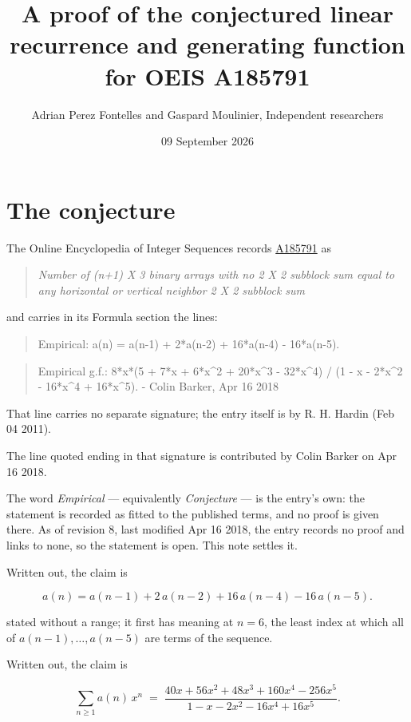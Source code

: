 \documentclass[11pt]{article}
\title{A proof of the conjectured linear recurrence and generating function for OEIS A185791}
\author{Adrian Perez Fontelles and Gaspard Moulinier, Independent researchers}
\date{09 September 2026}
\theoremstyle{definition}
\begin{document}
\maketitle
\section{The conjecture}

The Online Encyclopedia of Integer Sequences records \href{https://oeis.org/A185791}{A185791} as

\begin{quote}\itshape Number of (n+1) X 3 binary arrays with no 2 X 2 subblock sum equal to any horizontal or vertical neighbor 2 X 2 subblock sum\end{quote}

and carries in its Formula section the lines:

\begin{quote}\ttfamily Empirical: a(n) = a(n-1) + 2*a(n-2) + 16*a(n-4) - 16*a(n-5).\end{quote}

\begin{quote}\ttfamily Empirical g.f.: 8*x*(5 + 7*x + 6*x\textasciicircum{}2 + 20*x\textasciicircum{}3 - 32*x\textasciicircum{}4) / (1 - x - 2*x\textasciicircum{}2 - 16*x\textasciicircum{}4 + 16*x\textasciicircum{}5). - Colin Barker, Apr 16 2018\end{quote}

That line carries no separate signature; the entry itself is by R. H. Hardin (Feb 04 2011).

The line quoted ending in that signature is contributed by Colin Barker on Apr 16 2018.

The word {\itshape Empirical} --- equivalently {\itshape Conjecture} --- is the entry's own: the statement is recorded as fitted to the published terms, and no proof is given there. As of revision 8, last modified Apr 16 2018, the entry records no proof and links to none, so the statement is open. This note settles it.

Written out, the claim is

\[a(n) = a(n-1) + 2\,a(n-2) + 16\,a(n-4) - 16\,a(n-5).\]

stated without a range; it first has meaning at $n = 6$, the least index at which all of $a(n-1),\dots,a(n-5)$ are terms of the sequence.

Written out, the claim is

\[\sum_{n \ge 1} a(n)\,x^n \;=\; \frac{40x + 56x^{2} + 48x^{3} + 160x^{4} - 256x^{5}}{1 - x - 2x^{2} - 16x^{4} + 16x^{5}}.\]
\end{document}

